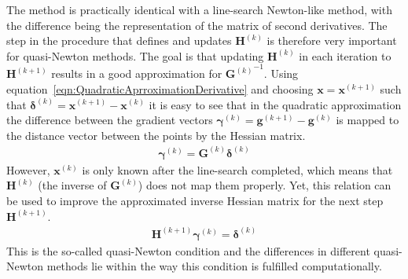 The method is practically identical with a line-search Newton-like method, with
the difference being the representation of the matrix of second derivatives.
The step in the procedure that defines and updates $\mathbf{H}^{(k)}$ is
therefore very important for quasi-Newton methods. The goal is that updating
$\mathbf{H}^{(k)}$ in each iteration to $\mathbf{H}^{(k+1)}$ results in a good
approximation for ${\mathbf{G}^{(k)}}^{-1}$. Using
equation~\eqref{eqn:QuadraticAprroximationDerivative} and choosing
$\mathbf{x}=\mathbf{x}^{(k+1)}$ such that
$\bm{\delta}^{(k)}=\mathbf{x}^{(k+1)}-\mathbf{x}^{(k)}$ it is easy to see that
in the quadratic approximation the difference between the gradient vectors
$\bm{\gamma}^{(k)}=\mathbf{g}^{(k+1)}-\mathbf{g}^{(k)}$ is mapped to the
distance vector between the points by the Hessian matrix.
%
\begin{align}
    \bm{\gamma}^{(k)}=\mathbf{G}^{(k)}\bm{\delta}^{(k)}
\end{align}
%
However, $\mathbf{x}^{(k)}$ is only known after the line-search completed,
which means that $\mathbf{H}^{(k)}$ (the inverse of $\mathbf{G}^{(k)}$) does
not map them properly. Yet, this relation can be used to improve the
approximated inverse Hessian matrix for the next step $\mathbf{H}^{(k+1)}$.
%
\begin{align}
    \mathbf{H}^{(k+1)}\bm{\gamma}^{(k)}=\bm{\delta}^{(k)}\label{eqn:QuasiNewtonCondition}
\end{align}
%
This is the so-called quasi-Newton condition and the differences in different
quasi-Newton methods lie within the way this condition is fulfilled
computationally.


